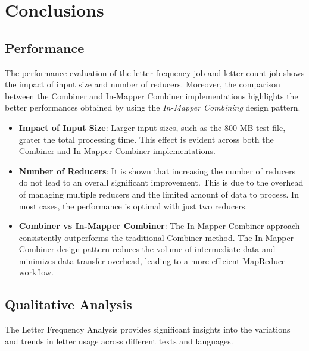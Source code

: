 \newpage
\section{Conclusions}

\subsection{Performance}

The performance evaluation of the letter frequency job and letter count job shows the impact of input size and number of reducers. Moreover, the comparison between the Combiner and In-Mapper Combiner implementations highlights the better performances obtained by using the \textit{In-Mapper Combining} design pattern.

\begin{itemize}
\item \textbf{Impact of Input Size}: Larger input sizes, such as the 800 MB test file, grater the total processing time. This effect is evident across both the Combiner and In-Mapper Combiner implementations.
\item \textbf{Number of Reducers}: It is shown that increasing the number of reducers do not lead to an overall significant improvement. This is due to the overhead of managing multiple reducers and the limited amount of data to process. In most cases, the performance is optimal with just two reducers.

\item \textbf{Combiner vs In-Mapper Combiner}: The In-Mapper Combiner approach consistently outperforms the traditional Combiner method. The In-Mapper Combiner design pattern reduces the volume of intermediate data and minimizes data transfer overhead, leading to a more efficient MapReduce workflow.
\end{itemize}


\subsection{Qualitative Analysis}

The Letter Frequency Analysis provides significant insights into the variations and trends in letter usage across different texts and languages.

